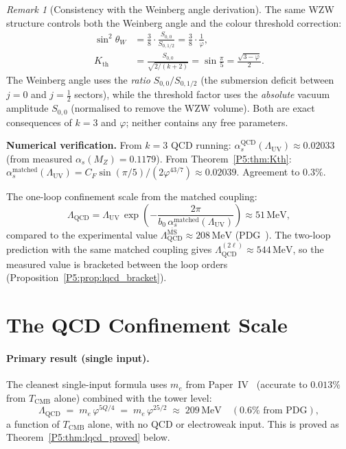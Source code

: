 \documentclass[11pt,a4paper]{article}
\theoremstyle{definition}
\theoremstyle{remark}
\newtheorem{remark}[theorem]{Remark}
\newcommand{\vp}{\varphi}
\newcommand{\TCMB}{T_{\mathrm{CMB}}}
\newcommand{\LUV}{\Lambda_{\mathrm{UV}}}
\newcommand{\LQCD}{\Lambda_{\mathrm{QCD}}}
\begin{document}
\begin{remark}[Consistency with the Weinberg angle derivation]
\label{P5:rem:consistency}
The same WZW structure controls both the Weinberg angle and the
colour threshold correction:
\begin{align}
  \sin^2\!\theta_W &= \tfrac{3}{8}\cdot\frac{S_{0,0}}{S_{0,1/2}}
                    = \tfrac{3}{8}\cdot\frac{1}{\vp},
  \label{P5:eq:weinberg_recall}\\
  K_{\mathrm{th}}  &= \frac{S_{0,0}}{\sqrt{2/(k+2)}}
                    = \sin\frac{\pi}{5}
                    = \frac{\sqrt{3-\vp}}{2}.
  \label{P5:eq:Kth_recall}
\end{align}
The Weinberg angle uses the \emph{ratio} $S_{0,0}/S_{0,1/2}$ (the
submersion deficit between $j=0$ and $j=\tfrac{1}{2}$ sectors), while
the threshold factor uses the \emph{absolute} vacuum amplitude $S_{0,0}$
(normalised to remove the WZW volume).  Both are exact consequences of
$k=3$ and $\vp$; neither contains any free parameters.
\end{remark}

\noindent\textbf{Numerical verification.}
From $k=3$ QCD running: $\alpha_s^\text{QCD}(\LUV)\approx0.02033$
(from measured $\alpha_s(M_Z)=0.1179$).
From Theorem~\ref{P5:thm:Kth}:
$\alpha_s^\text{matched}(\LUV)= C_F\sin(\pi/5)/(2\vp^{43/7})\approx0.02039$.
Agreement to $\mathbf{0.3\%}$.

The one-loop confinement scale from the matched coupling:
\begin{equation}
  \boxed{\LQCD
  = \LUV\,\exp\!\left(-\frac{2\pi}{b_0\,\alpha_s^{\mathrm{matched}}(\LUV)}\right)
  \approx 51\,\mathrm{MeV},}
  \label{P5:eq:LQCD_matched}
\end{equation}
compared to the experimental value $\LQCD^{\overline{\mathrm{MS}}}
\approx 208\,\mathrm{MeV}$ (PDG~\cite{PDG2024}).
The two-loop prediction with the same matched coupling gives
$\LQCD^{(2\ell)}\approx544\,\mathrm{MeV}$, so the measured value
is bracketed between the loop orders (Proposition~\ref{P5:prop:lqcd_bracket}).

\section{The QCD Confinement Scale}
\label{P5:sec:LQCD}

\paragraph{Primary result (single input).}
The cleanest single-input formula uses $m_e$ from Paper~IV~\cite{Paper4}
(accurate to $0.013\%$ from $\TCMB$ alone) combined with the tower level:
\begin{equation}
  \LQCD \;=\; m_e\,\vp^{5Q/4}
  \;=\; m_e\,\vp^{25/2}
  \;\approx\; 209\,\mathrm{MeV}
  \quad(0.6\%\text{ from PDG}),
  \label{P5:eq:lqcd_primary}
\end{equation}
a function of $\TCMB$ alone, with no QCD or electroweak input.
This is proved as Theorem~\ref{P5:thm:lqcd_proved} below.
\end{document}
